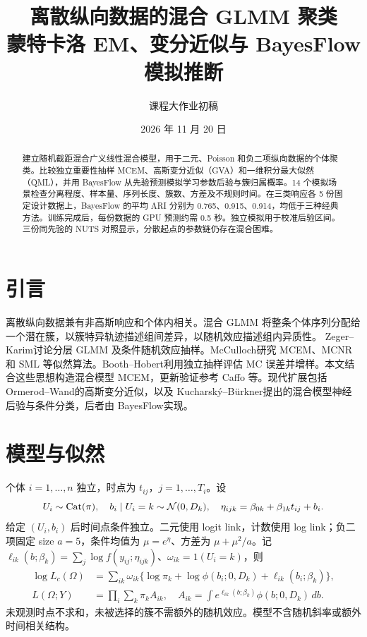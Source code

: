 \documentclass[UTF8,a4paper,11pt,fontset=fandol]{ctexart}
\title{离散纵向数据的混合 GLMM 聚类\\\large 蒙特卡洛 EM、变分近似与 BayesFlow 模拟推断}
\author{课程大作业初稿}\date{2026 年 11 月 20 日}
\begin{document}
\maketitle
\begin{abstract}
建立随机截距混合广义线性混合模型，用于二元、Poisson 和负二项纵向数据的个体聚类。比较独立重要性抽样 MCEM、高斯变分近似（GVA）和一维积分最大似然（QML），并用 BayesFlow 从先验预测模拟学习参数后验与簇归属概率。14 个模拟场景检查分离程度、样本量、序列长度、簇数、方差及不规则时间。在三类响应各 5 份固定设计数据上，BayesFlow 的平均 ARI 分别为 0.765、0.915、0.914，均低于三种经典方法。训练完成后，每份数据的 GPU 预测约需 0.5 秒。独立模拟用于校准后验区间。三份同先验的 NUTS 对照显示，分散起点的参数链仍存在混合困难。
\end{abstract}
\section{引言}
离散纵向数据兼有非高斯响应和个体内相关。混合 GLMM 将整条个体序列分配给一个潜在簇，以簇特异轨迹描述组间差异，以随机效应描述组内异质性。
Zeger--Karim\cite{zeger}讨论分层 GLMM 及条件随机效应抽样。McCulloch\cite{mcculloch}研究 MCEM、MCNR 和 SML 等似然算法。Booth--Hobert\cite{booth}利用独立抽样评估 MC 误差并增样。本文结合这些思想构造混合模型 MCEM，更新验证参考 Caffo 等\cite{caffo}。现代扩展包括 Ormerod--Wand\cite{ormerod}的高斯变分近似，以及 Kucharský--Bürkner\cite{sbi-mixtures}提出的混合模型神经后验与条件分类，后者由 BayesFlow\cite{bayesflow}实现。

\section{模型与似然}
个体 $i=1,\ldots,n$ 独立，时点为 $t_{ij}$，$j=1,\ldots,T_i$。设
\[
U_i\sim\operatorname{Cat}(\pi),\quad b_i\mid U_i=k\sim\mathcal N(0,D_k),\quad
\eta_{ijk}=\beta_{0k}+\beta_{1k}t_{ij}+b_i.
\]
给定 $(U_i,b_i)$ 后时间点条件独立。二元使用 logit link，计数使用 log link；负二项固定 size $a=5$，条件均值为 $\mu=e^\eta$、方差为 $\mu+\mu^2/a$。记 $\ell_{ik}(b;\beta_k)=\sum_j\log f(y_{ij};\eta_{ijk})$、$\omega_{ik}=1(U_i=k)$，则
\begin{align}
\log L_c(\Omega)&=\sum_{ik}\omega_{ik}\{\log\pi_k+\log\phi(b_i;0,D_k)+\ell_{ik}(b_i;\beta_k)\},\\
L(\Omega;Y)&=\prod_i\sum_k\pi_k A_{ik},\quad
A_{ik}=\int e^{\ell_{ik}(b;\beta_k)}\phi(b;0,D_k)\,db.
\end{align}
未观测时点不求和，未被选择的簇不需额外的随机效应。模型不含随机斜率或额外时间相关结构。
\end{document}
